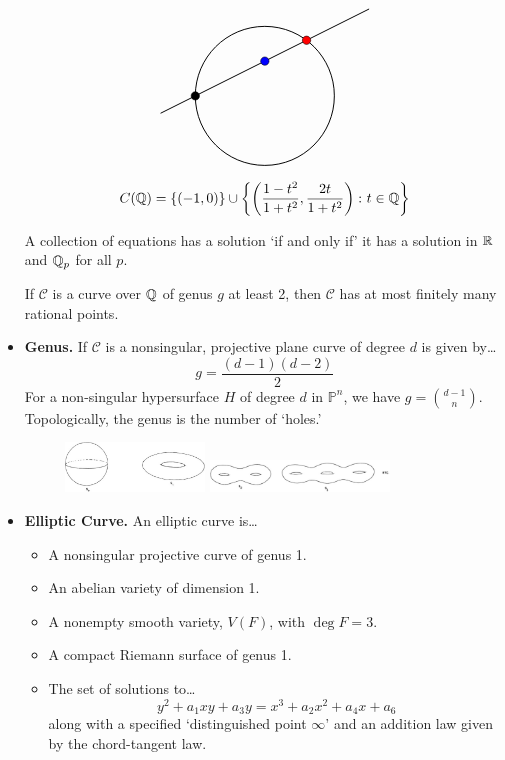 \documentclass[11pt,letterpaper]{article}
\begin{document}
\begin{itemize}
\[\begin{tikzpicture}[scale=1.75]
	\draw[line width=0.7] (-1.5,-0.25) -- (1.5,1.25);
	\draw[line width=0.7] (0,0) circle (1);
	
	\draw[fill=black] (-1,0) circle (0.06);
	\draw[fill=blue] (0,0.5) circle (0.06);
	\draw[fill=red] (0.6,0.8) circle (0.06);
	\end{tikzpicture}
	\] \vfill
	\[
	C(\mathbb{Q})= \{ (-1,0) \} \cup \left\{ \left(\dfrac{1-t^2}{1+t^2}, \dfrac{2t}{1+t^2} \right) \colon t \in \mathbb{Q} \right\}
	\]

\begin{prin}
A collection of equations has a solution `if and only if' it has a solution in $\mathbb{R}$ and $\mathbb{Q}_p$ for all $p$.
\end{prin} 

\begin{thm}
If $\mathcal{C}$ is a curve over $\mathbb{Q}$ of genus $g$ at least 2, then $\mathcal{C}$ has at most finitely many rational points. 
\end{thm}

\item {\bfseries Genus.} If $\mathcal{C}$ is a nonsingular, projective plane curve of degree $d$ is given by\dots
	\[
	g= \dfrac{(d - 1)(d - 2)}{2}
	\]
For a non-singular hypersurface $H$ of degree $d$ in $\mathbb{P}^n$, we have $g= \binom{d - 1}{n}$. Topologically, the genus is the number of `holes.' 
	\begin{figure}[ht]
	\centering
	\includegraphics[width=0.35\textwidth]{../images/genus1.png} \quad
	\includegraphics[width=0.45\textwidth]{../images/genus2.png}
	\end{figure}

\item {\bfseries Elliptic Curve.} An elliptic curve is\dots
	\begin{itemize}
	\item A nonsingular projective curve of genus 1.
	\item An abelian variety of dimension 1.
	\item A nonempty smooth variety, $V(F)$, with $\deg F=3$.
	\item A compact Riemann surface of genus 1.
	\item The set of solutions to\dots
	\[
	y^2 + a_1 xy + a_3y = x^3 + a_2 x^2 + a_4 x + a_6
	\]
along with a specified `distinguished point $\infty$' and an addition law given by the chord-tangent law.
	\end{itemize}


\end{itemize}
\end{document}
